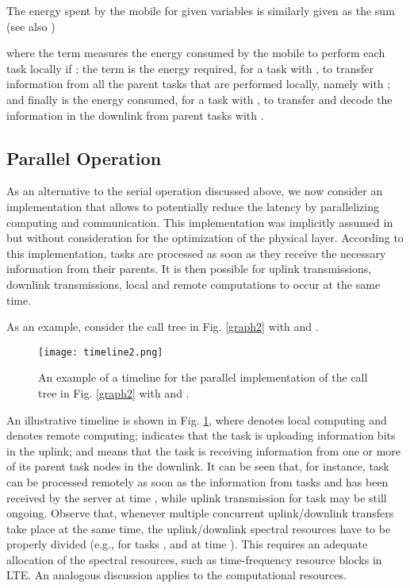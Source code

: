 \documentclass[journal,twocolumn,10pt,twoside]{IEEEtranTCOM}
\theoremstyle{plain}
\theoremstyle{plain}
\theoremstyle{remark}
\begin{document}
The energy spent by the mobile for given variables is similarly given as the sum (see also \cite{bar})

where the term  measures the energy consumed by the mobile to perform each task  locally if ; the term  is the energy required, for a task  with , to transfer information from all the parent tasks  that are performed locally, namely with ; and finally  is the energy consumed, for a task  with , to transfer and decode the information in the downlink from parent tasks  with .


\subsection{Parallel Operation}
\label{sec:par:op}
As an alternative to the serial operation discussed above, we now consider an implementation that allows to potentially reduce the latency by parallelizing computing and communication. This implementation was implicitly assumed in \cite{no}\cite{hermp} but without consideration for the optimization of the physical layer. According to this implementation, tasks are processed as soon as they receive the necessary information from their parents. It is then possible for uplink transmissions, downlink transmissions, local and remote computations to  occur at the same time.

As an example, consider the call tree  in Fig. \ref{graph2} with  and .
\begin{figure}
\centering
\texttt{[image: timeline2.png]}
\caption{An example of a timeline for the parallel implementation of the call tree  in Fig. \ref{graph2} with  and .}\label{time_line}
\vspace{-1.5em}
\end{figure}
An illustrative timeline is shown in Fig. \ref{time_line}, where   denotes local computing and  denotes remote computing;  indicates that the task is uploading information bits in the uplink; and  means that the task is receiving information from one or more of its parent task nodes  in the downlink. It can be seen that, for instance,  task  can be processed remotely as soon as the information from tasks  and  has been received by the server at time , while uplink transmission for task  may be still ongoing. Observe that, whenever multiple concurrent uplink/downlink transfers take place at the same time, the uplink/downlink spectral resources have to be properly divided (e.g., for tasks ,  and  at time ). This requires an adequate allocation of the spectral resources, such as time-frequency resource blocks in LTE. An analogous discussion applies to the computational resources.
\end{document}

